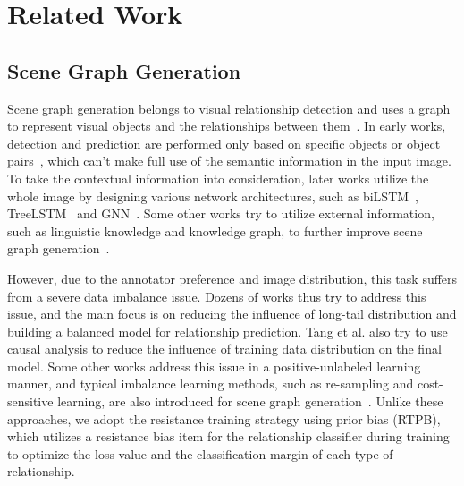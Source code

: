 \section{Related Work}

\subsection{Scene Graph Generation}
Scene graph generation belongs to visual relationship detection and uses a graph to represent visual objects and the relationships between them~\cite{scene-graph}. In early works, detection and prediction are performed only based on specific objects or object pairs~\cite{Lu16}, which can't make full use of the semantic information in the input image. To take the contextual information into consideration, later works utilize the whole image by designing various network architectures, such as biLSTM~\cite{Zellers_2018_CVPR}, TreeLSTM~\citep{VCTree_tang} and GNN~\cite{Yang_2018_ECCV,li2021relationship}.
Some other works try to utilize external information, such as linguistic knowledge and knowledge graph, to further improve scene graph generation~\cite{Lu16, chen2019knowledge, Yu2017,gu2019scene}.

However, due to the annotator preference and image distribution, this task suffers from a severe data imbalance issue. Dozens of works thus try to address this issue, and 
the main focus is on reducing the influence of long-tail distribution and building a balanced model for relationship prediction. Tang et al. also try to use causal analysis \cite{Tang2020_unbiased} to reduce the influence of training data distribution on the final model. Some other works \cite{chen2019soft,zhan2020multi,chiou2021recovering} address this issue in a positive-unlabeled learning manner, and typical imbalance learning methods, such as re-sampling and cost-sensitive learning, are also introduced for scene graph generation~\cite{li2021bipartite, yan2020pcpl}. Unlike these approaches, we adopt the resistance training strategy using prior bias (RTPB), which utilizes a resistance bias item for the relationship classifier during training to optimize the loss value and the classification margin of each type of relationship.

